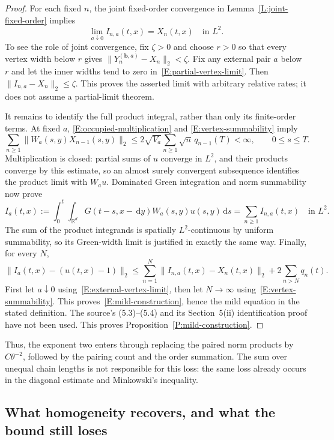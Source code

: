 \documentclass[12pt]{article}
\numberwithin{equation}{section}
\theoremstyle{definition}
\newcommand{\R}{\mathbb{R}}
\newcommand{\ud}{\,\mathrm{d}}
\begin{document}
\begin{proof}
  For each fixed $n$, the joint fixed-order convergence in
  Lemma~\ref{L:joint-fixed-order} implies
  \begin{equation}\label{E:external-vertex-limit}
    \lim_{a\downarrow0}I_{n,a}(t,x)=X_n(t,x)\quad\text{in }L^2.
  \end{equation}
  To see the role of joint convergence, fix $\zeta>0$ and choose
  $r>0$ so that every vertex width below $r$ gives
  $\|Y_n^{(\boldsymbol b,a)}-X_n\|_2<\zeta$.
  Fix any external pair $a$ below $r$ and let the inner widths tend
  to zero in~\eqref{E:partial-vertex-limit}. Then
  $\|I_{n,a}-X_n\|_2\le\zeta$. This proves the asserted limit with
  arbitrary relative rates; it does not assume a partial-limit theorem.

  It remains to identify the full product integral, rather than only
  its finite-order terms. At fixed $a$,
  \eqref{E:occupied-multiplication} and
  \eqref{E:vertex-summability} imply
  \[
    \sum_{n\ge1}\|W_a(s,y)X_{n-1}(s,y)\|_2
    \le2\sqrt{V_a}\sum_{n\ge1}\sqrt n\,q_{n-1}(T)<\infty,
    \qquad0\le s\le T.
  \]
  Multiplication is closed: partial sums of $u$ converge in $L^2$,
  and their products converge by this estimate, so an almost surely
  convergent subsequence identifies the product limit with $W_a u$.
  Dominated Green integration and norm summability now prove
  \[
    I_a(t,x):=\int_0^t\int_{\R^d}G(t-s,x-\ud y)
    W_a(s,y)u(s,y)\ud s
    =\sum_{n\ge1}I_{n,a}(t,x)\quad\text{in }L^2.
  \]
  The sum of the product integrands is spatially $L^2$-continuous
  by uniform summability, so its Green-width limit is justified in
  exactly the same way. Finally, for every $N$,
  \[
    \|I_a(t,x)-(u(t,x)-1)\|_2
    \le\sum_{n=1}^N\|I_{n,a}(t,x)-X_n(t,x)\|_2
    +2\sum_{n>N}q_n(t).
  \]
  First let $a\downarrow0$ using~\eqref{E:external-vertex-limit}, then
  let $N\to\infty$ using~\eqref{E:vertex-summability}.
  This proves~\eqref{E:mild-construction}, hence the mild equation in
  the stated definition. The source's (5.3)--(5.4) and its Section~5(ii)
  identification proof have not been used.
  This proves Proposition~\ref{P:mild-construction}.
\end{proof}

Thus, the exponent two enters through replacing the paired norm products
by $C\theta^{-2}$, followed by the pairing count and the order summation.
The sum over unequal chain lengths is not responsible for this loss:
the same loss already occurs in the diagonal estimate and Minkowski's
inequality.

\subsection{What homogeneity recovers, and what the bound still loses}
\end{document}
